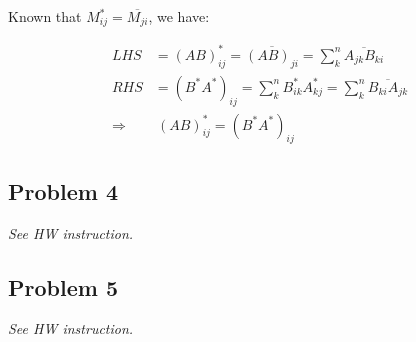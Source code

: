 \documentclass[11pt]{article}
\begin{document}
Known that $M_{ij}^* = \overline{M_{ji}}$, we have:

\begin{align*}
    LHS &= (AB)^*_{ij} = \overline{(AB)_{ji}} = \sum^{n}_{k} \overline{A_{jk} B_{ki}} \\
    RHS &= (B^* A^*)_{ij} = \sum^{n}_{k} B^{*}_{ik} A^{*}_{kj} = \sum^{n}_{k} \overline{B_{ki} A_{jk}} \\
    \Longrightarrow& \  (AB)^*_{ij} = (B^* A^*)_{ij}
\end{align*}

\subsection*{Problem 4}
\textit{See HW instruction.}\newline

\subsection*{Problem 5}
\textit{See HW instruction.}\newline
\end{document}
